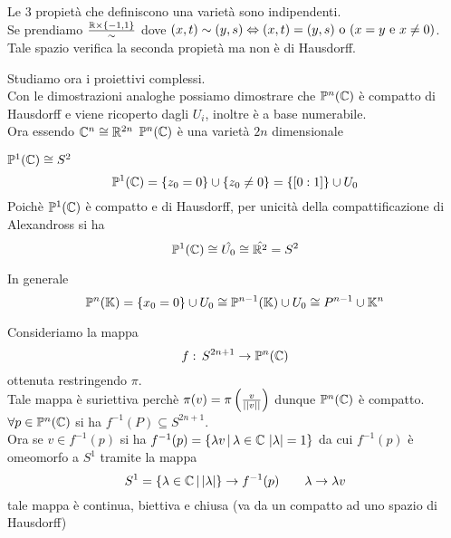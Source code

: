 \begin{oss}Le $3$ propiet\`a che definiscono una variet\`a sono indipendenti.\\
Se prendiamo $\frac{\mathbb{R}\times \{ -1, 1 \} }{\sim}$ dove $(x,t)\sim (y,s) \Leftrightarrow (x,t)=(y,s) \text{ o }  (x=y \text{ e } x \neq 0 )$.\\
Tale spazio verifica la seconda propiet\`a  ma non \`e di Hausdorff.
\end{oss}
\newpage
Studiamo ora i proiettivi complessi.\\
Con le dimostrazioni analoghe possiamo dimostrare che $ \mathbb{P}^n(\mathbb{C})$ \`e compatto di Hausdorff e viene ricoperto dagli $U_i$, inoltre \`e a base numerabile.\\
Ora essendo $\mathbb{C}^n \cong \mathbb{R}^{2n}$ $\mathbb{P}^n(\mathbb{C})$ \`e una variet\`a $2n$ dimensionale
\begin{prop}$\mathbb{P}^1( \mathbb{C}) \cong S^2$
\proof $$\mathbb{P}^1(\mathbb{C}) =\{ z_0 = 0\} \cup \{ z_0 \neq 0 \} = \{ [0:1]\} \cup U_0$$
Poich\`e $\mathbb{P}^1(\mathbb{C})$ \`e compatto e di Hausdorff, per unicit\`a della compattificazione di Alexandross si ha 
$$ \mathbb{P}^1(\mathbb{C}) \cong \hat{U_0} \cong \hat{\mathbb{R}^2} = S^2$$
\begin{oss}In generale 
$$ \mathbb{P}^n(\mathbb{K}) = \{ x_0 = 0 \}  \cup U_0 \cong \mathbb{P}^{n-1}(\mathbb{K}) \cup U_0 \cong P^{n-1}\cup \mathbb{K}^n$$
\end{oss}
\end{prop}
\spazio
Consideriamo la mappa 
$$ f:\, S^{2n+1} \to \mathbb{P}^n(\mathbb{C})$$ ottenuta restringendo $\pi$.\\
Tale mappa \`e suriettiva  perch\`e $\pi(v) = \pi\left(\frac{v}{\vert \vert v \vert \vert } \right)$  dunque $\mathbb{P}^n(\mathbb{C})$ \`e compatto.\\
 $\forall p \in \mathbb{P}^n(\mathbb{C})$ si ha $f^{-1}(P)\subseteq S^{2n+1}$.\\
 Ora se $v \in f^{-1}(p)$ si ha $f^{-1}(p)=\{ \lambda v \, \vert \, \lambda\in \mathbb{C} \, \, \vert \lambda\vert =1\}$ da cui $f^{-1}(p)$ \`e omeomorfo a $S^1$ tramite la mappa 
 $$ S^1=\{ \lambda \in \mathbb{C} \, \vert \, \vert \lambda \vert \} \to f^{-1}(p) \qquad \lambda \to \lambda v$$
 tale mappa \`e continua, biettiva e chiusa (va da un compatto ad uno spazio di Hausdorff)
 \newpage

